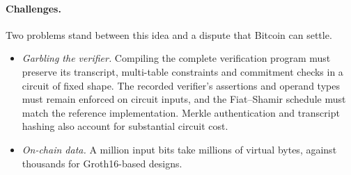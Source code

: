 \documentclass[11pt]{article}
\begin{document}
\paragraph{Challenges.} Two problems stand between this idea and a
dispute that Bitcoin can settle.
\begin{itemize}
  \item[C1] \emph{Garbling the verifier.} Compiling the complete verification
    program must preserve its transcript, multi-table constraints and
    commitment checks in a circuit of fixed shape. The recorded verifier's
    assertions and operand types must remain enforced on circuit inputs, and
    the Fiat--Shamir schedule must match the reference implementation.
    Merkle authentication and transcript hashing also account for substantial
    circuit cost.
  \item[C2] \emph{On-chain data.} A million input bits take millions of
    virtual bytes, against thousands for Groth16-based designs.
\end{itemize}
\end{document}
